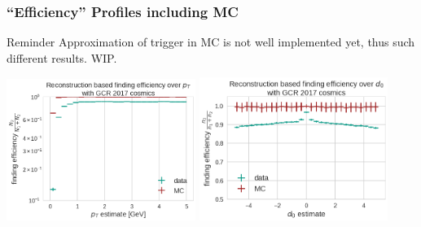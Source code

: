 \documentclass[18pt]{beamer}
\begin{document}
    \begin{frame}
    \frametitle{``Efficiency'' Profiles including MC}
    \begin{alertblock}{Reminder}
      Approximation of trigger in MC is not well implemented yet, thus such different results. WIP.
    \end{alertblock}
    \begin{center}
      \includegraphics[width=0.46\textwidth]{figures/findeff_pt_data_mc.png}
      \includegraphics[width=0.46\textwidth]{figures/findeff_d0_data_mc.png}
    \end{center}
  \end{frame}
  
\end{document}

